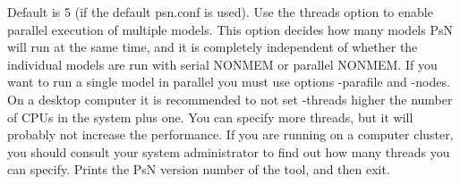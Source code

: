 \begin{optionlist}
Default is 5 (if the default psn.conf is used). Use the threads option to enable parallel execution of multiple models.
This option decides how many models PsN will run at the same time, and it is completely independent of whether the individual models are run with serial NONMEM or parallel NONMEM. If you want to run a single model in parallel you must use options -parafile and -nodes. On a desktop computer it is recommended to not set -threads higher the number of CPUs in the system plus one. 
You can specify more threads, but it will probably not increase the performance. If you are running on a computer cluster, you should consult your system administrator to find out how many threads you can specify. 
\nextopt
{}
Prints the PsN version number of the tool, and then exit. 
\nextopt
\end{optionlist}
